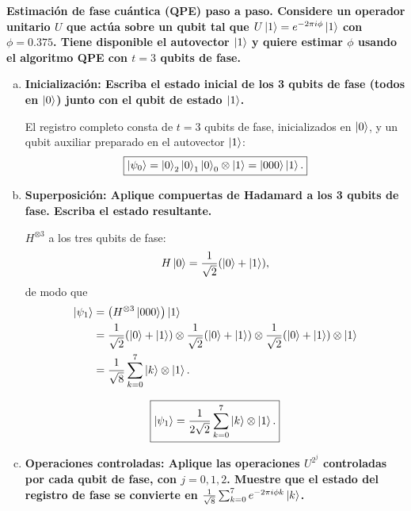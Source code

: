 {\bfseries Estimación de fase cuántica (QPE) paso a paso. Considere un operador unitario $U$ que actúa sobre un qubit tal que $U\ket{1} = e^{-2\pi i\phi}\ket{1}$ con $\phi = 0.375$. Tiene disponible el autovector $\ket{1}$ y quiere estimar $\phi$ usando el algoritmo QPE con $t = 3$ qubits de fase.}

\begin{enumerate}[a)]
	\item {\bfseries Inicialización: Escriba el estado inicial de los 3 qubits de fase (todos en $\ket{0}$) junto con el qubit de estado $\ket{1}$.}

	      El registro completo consta de $t = 3$ qubits de fase, inicializados en $\ket{0}$, y un qubit auxiliar preparado en el autovector $\ket{1}$:
	      \[
		      \boxed{\ket{\psi_0} = \ket{0}_2\ket{0}_1\ket{0}_0 \otimes \ket{1} = \ket{000}\ket{1}.}
	      \]

	      \vspace{3mm}

	\item {\bfseries Superposición: Aplique compuertas de Hadamard a los 3 qubits de fase. Escriba el estado resultante.}

	      $H^{\otimes 3}$ a los tres qubits de fase:
	      \[
		      H\ket{0} = \frac{1}{\sqrt{2}}(\ket{0} + \ket{1}),
	      \]
	      de modo que
	      \begin{align*}
		      \ket{\psi_1} & = \left(H^{\otimes 3}\ket{000}\right)\ket{1}                                                                                                  \\
		                   & = \frac{1}{\sqrt{2}}(\ket{0}+\ket{1}) \otimes \frac{1}{\sqrt{2}}(\ket{0}+\ket{1}) \otimes \frac{1}{\sqrt{2}}(\ket{0}+\ket{1}) \otimes \ket{1} \\
		                   & = \frac{1}{\sqrt{8}} \sum_{k=0}^{7} \ket{k} \otimes \ket{1}.
	      \end{align*}

	      \[
		      \boxed{\ket{\psi_1} = \frac{1}{2\sqrt{2}} \sum_{k=0}^{7} \ket{k} \otimes \ket{1}.}
	      \]

	      \vspace{3mm}

	\item {\bfseries Operaciones controladas: Aplique las operaciones $U^{2^j}$ controladas por cada qubit de fase, con $j = 0, 1, 2$. Muestre que el estado del registro de fase se convierte en $\frac{1}{\sqrt{8}}\sum_{k=0}^{7} e^{-2\pi i\phi k}\ket{k}$.}


\end{enumerate}
